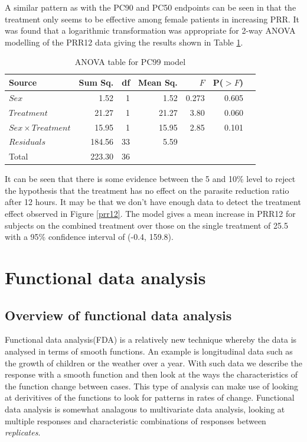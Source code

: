 A similar pattern as with the PC90 and PC50 endpoints can be seen in that the treatment only seems to be effective among female patients in increasing PRR. It was found that a logarithmic transformation was appropriate for 2-way ANOVA modelling of the PRR12 data giving the results shown in Table \ref{aovprr12}.
\begin{table}[h]
\centering
\caption{ANOVA table for PC99 model}\label{aovprr12}
\begin{tabular}{l|rrrrrl}
Source&Sum Sq.&df&Mean Sq.&$F$&P($>F$)\\
\hline
$Sex$				& 1.52 & 1 & 1.52 & 0.273 & 0.605 & \\
$Treatment$			& 21.27   & 1 & 21.27   & 3.80 & 0.060 & \\
$Sex\times Treatment$	& 15.95   & 1 & 15.95   & 2.85   & 0.101 & \\
$Residuals$			& 184.56 & 33 & 5.59 &&&\\
\hline
Total&223.30&36&&&
\end{tabular}
\end{table}

It can be seen that there is some evidence between the 5 and 10\% level to reject the hypothesis that the treatment has no effect on the parasite reduction ratio after 12 hours. It may be that we don't have enough data to detect the treatment effect observed in Figure \ref{prr12}. The model gives a mean increase in PRR12 for subjects on the combined treatment over those on the single treatment of 25.5 with a 95\% confidence interval of (-0.4, 159.8).


\section{Functional data analysis}
\subsection{Overview of functional data analysis}
Functional data analysis(FDA) is a relatively new technique whereby the data is analysed in terms of smooth functions. An example is longitudinal data such as the growth of children or the weather over a year\cite{ramsay}. With such data we describe the response with a smooth function and then look at the ways the characteristics of the function change between cases. This type of analysis can make use of looking at derivitives of the functions to look for patterns in rates of change. Functional data analysis is somewhat analagous to multivariate data analysis, looking at multiple responses and characteristic combinations of responses between \emph{replicates}.

